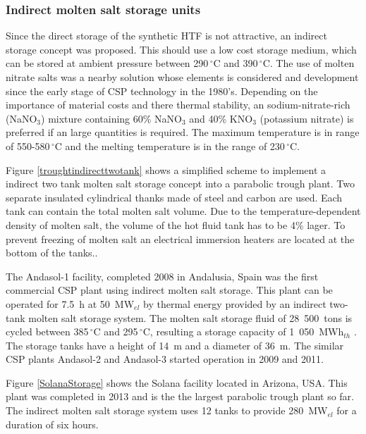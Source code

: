 \subsubsection{Indirect molten salt storage units}
Since the direct storage of the synthetic HTF is not attractive, an indirect storage concept was proposed. This should use a low cost storage medium, which can be stored at ambient pressure between 290$\,^{\circ}\mathrm{C}$ and 390$\,^{\circ}\mathrm{C}$. The use of molten nitrate salts was a nearby solution whose elements is considered and development since the early stage of CSP technology in the 1980's. Depending on the importance of material costs and there thermal stability, an sodium-nitrate-rich (NaNO$_3$) mixture containing 60\% NaNO$_3$ and 40\% KNO$_3$ (potassium nitrate) is preferred if an large quantities is required. The maximum temperature is in range of 550-580$\,^{\circ}\mathrm{C}$ and the melting temperature is in the range of 230$\,^{\circ}\mathrm{C}$. \cite{Richter2013}

Figure \ref{troughtindirecttwotank} shows a simplified scheme to implement a indirect two tank molten salt storage concept into a parabolic trough plant. Two separate insulated cylindrical thanks made of steel and carbon are used. Each tank can contain the total molten salt volume. Due to the temperature-dependent density of molten salt, the volume of the hot fluid tank has to be 4\% lager. To prevent freezing of molten salt an electrical immersion heaters are located at the bottom of the tanks.\cite{Kelly2006}.

The Andasol-1 facility, completed 2008 in Andalusia, Spain was the first commercial CSP plant using indirect molten salt storage. This plant can be operated for 7.5~h at 50~MW$_{el}$ by thermal energy provided by an indirect two-tank molten salt storage system. The molten salt storage fluid of 28~500~tons is cycled between 385$\,^{\circ}\mathrm{C}$ and 295$\,^{\circ}\mathrm{C}$, resulting a storage capacity of 1~050~MWh$_{th}$ \cite{Relloso2009}. The storage tanks have a height of 14~m and a diameter of 36~m. The similar CSP plants Andasol-2 and Andasol-3 started operation in 2009 and 2011. \cite{SolarMillenniumAG2008,NREL2008,NREL2013a,NREL2013}

Figure \ref{SolanaStorage} shows the Solana facility located in Arizona, USA. This plant was completed in 2013 and is the the largest parabolic trough plant so far. The indirect molten salt storage system uses 12 tanks to provide 280~MW$_{el}$ for a duration of six hours. \cite{AbengoaSolar2013a}

